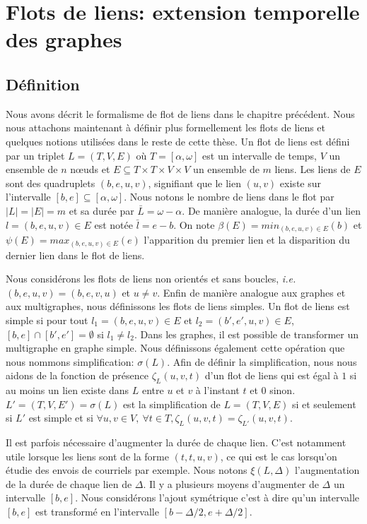 \chapter{Flots de liens: extension temporelle des graphes}
\minitoc
\label{chap:def_flot}

\section{Définition}
\label{sec:definition}

Nous avons décrit le formalisme de flot de liens dans le chapitre précédent.
Nous nous attachons maintenant à définir plus formellement les flots de liens et quelques notions utilisées dans le reste de cette thèse.
Un flot de liens est défini par un triplet $L=(T,V,E)$ où $T=[\alpha, \omega]$ est un intervalle de temps, $V$ un ensemble de $n$ n\oe{}uds et $E\subseteq T\times T \times V \times V$ un ensemble de $m$ liens.
Les liens de $E$ sont des quadruplets $(b,e,u,v)$, signifiant que le lien $(u, v)$ existe sur l'intervalle $[b,e] \subseteq [\alpha,\omega]$.
Nous notons le nombre de liens dans le flot par $|L|=|E|=m$ et sa durée par $\bar{L}=\omega-\alpha$.
De manière analogue, la durée d'un lien $l=(b,e,u,v) \in E$ est notée $\bar{l}=e-b$.
On note $\beta(E)= min_{(b,e,u,v) \in E} (b)$ et $\psi(E)= max_{(b,e,u,v) \in E} (e)$ l'apparition du premier lien et la disparition du dernier lien dans le flot de liens.

Nous considérons les flots de liens non orientés et sans boucles, \emph{i.e.} $(b,e,u,v)=(b,e,v,u)$ et $u \neq v$.
Enfin de manière analogue aux graphes et aux multigraphes, nous définissons les flots de liens simples.
Un flot de liens est simple si pour tout $l_1=(b,e,u,v) \in E$ et $l_2=(b',e',u, v) \in E$, $[b,e]\cap [b', e'] = \emptyset$ si $l_1 \neq l_2$.
Dans les graphes, il est possible de transformer un multigraphe en graphe simple.
Nous définissons également cette opération que nous nommons simplification: $\sigma(L)$.
Afin de définir la simplification, nous nous aidons de la fonction de présence $\zeta_{L}(u,v,t)$ d'un flot de liens qui est égal à $1$ si au moins un lien existe dans $L$ entre $u$ et $v$ à l'instant $t$ et $0$ sinon.
$L'=(T,V,E')= \sigma(L)$ est la simplification de $L=(T,V,E)$ si et seulement si $L'$ est simple et si $\forall u,v \in V,\ \forall t\in T, \zeta_{L}(u,v,t)= \zeta_{L'}(u,v,t)$.

Il est parfois nécessaire d'augmenter la durée de chaque lien.
C'est notamment utile lorsque les liens sont de la forme $(t,t,u,v)$, ce qui est le cas lorsqu'on étudie des envois de courriels par exemple.
Nous notons $\xi(L,\Delta)$ l'augmentation de la durée de chaque lien de $\Delta$.
Il y a plusieurs moyens d'augmenter de $\Delta$ un intervalle $[b,e]$.
Nous considérons l'ajout symétrique c'est à dire qu'un intervalle $[b,e]$ est transformé en l'intervalle $[b-\Delta/2,e+\Delta/2]$.

